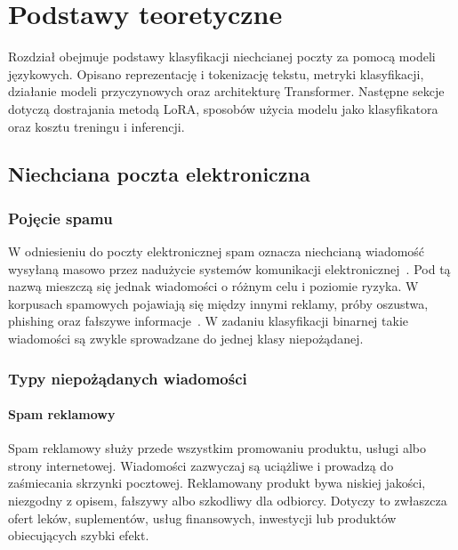 \chapter{Podstawy teoretyczne}

Rozdział obejmuje podstawy klasyfikacji niechcianej poczty za pomocą modeli
językowych. Opisano reprezentację i tokenizację tekstu, metryki klasyfikacji,
działanie modeli przyczynowych oraz architekturę Transformer. Następne sekcje
dotyczą dostrajania metodą LoRA, sposobów użycia modelu jako klasyfikatora oraz
kosztu treningu i inferencji.


\section{Niechciana poczta elektroniczna}

\subsection{Pojęcie spamu}

W odniesieniu do poczty elektronicznej spam oznacza niechcianą wiadomość
wysyłaną masowo przez nadużycie systemów komunikacji elektronicznej~\autocite{nist-csrc-spam-glossary}.
Pod tą nazwą mieszczą się jednak wiadomości
o różnym celu i poziomie ryzyka. W korpusach spamowych pojawiają się
między innymi reklamy, próby oszustwa, phishing oraz fałszywe
informacje~\autocite{janez-martino-spam-topic-2024}. W zadaniu klasyfikacji
binarnej takie wiadomości są zwykle sprowadzane do jednej klasy niepożądanej.

\subsection{Typy niepożądanych wiadomości}

\subsubsection{Spam reklamowy}

Spam reklamowy służy przede wszystkim promowaniu produktu, usługi albo strony
internetowej. Wiadomości zazwyczaj są uciążliwe i prowadzą do zaśmiecania skrzynki
pocztowej. Reklamowany produkt bywa niskiej jakości,
niezgodny z opisem, fałszywy albo szkodliwy dla odbiorcy. Dotyczy to zwłaszcza
ofert leków, suplementów, usług finansowych, inwestycji lub produktów
obiecujących szybki efekt.

